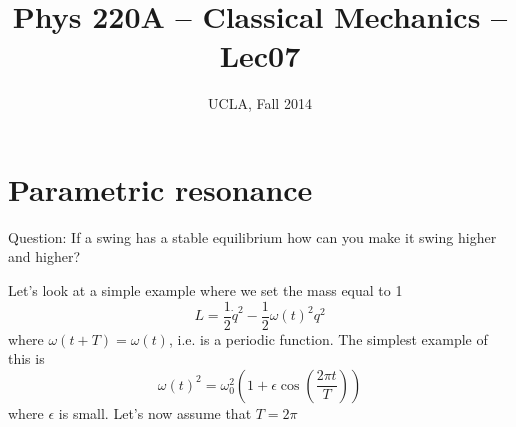 \documentclass[12pt]{article} %
\title{Phys 220A -- Classical Mechanics -- Lec07}
\author{UCLA, Fall 2014}
\date{\formatdate{23}{10}{2014}} %
\begin{document}
\setlength{\unitlength}{1mm}
\maketitle





\section{Parametric resonance}
Question: If a swing has a stable equilibrium how can you make it swing higher and higher?

Let's look at a simple example where we set the mass equal to 1
\begin{equation}
L = \frac{1}{2} \dot{q}^2 - \frac{1}{2} \omega(t)^2 q^2
\end{equation}
where $\omega(t + T) = \omega(t)$, i.e. is a periodic function. The simplest example of this is
\begin{equation}
\omega(t)^2 = \omega_0^2 \left( 1 + \epsilon \cos\left(\frac{2\pi t}{T}\right)\right)
\end{equation}
where $\epsilon$ is small. Let's now assume that $T = 2\pi$
\end{document}
